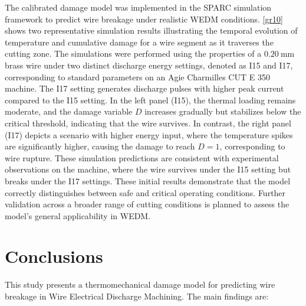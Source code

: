 \documentclass[5p,times,procedia]{elsarticle}
\begin{document}
The calibrated damage model was implemented in the SPARC simulation framework to predict wire breakage under realistic WEDM conditions. \autoref{gr10} shows two representative simulation results illustrating the temporal evolution of temperature and cumulative damage for a wire segment as it traverses the cutting zone. The simulations were performed using the properties of a $0.20~\mathrm{mm}$ brass wire under two distinct discharge energy settings, denoted as I15 and I17, corresponding to standard parameters on an Agie Charmilles CUT E 350 machine. The I17 setting generates discharge pulses with higher peak current compared to the I15 setting. In the left panel (I15), the thermal loading remains moderate, and the damage variable $D$ increases gradually but stabilizes below the critical threshold, indicating that the wire survives. In contrast, the right panel (I17) depicts a scenario with higher energy input, where the temperature spikes are significantly higher, causing the damage to reach $D=1$, corresponding to wire rupture. These simulation predictions are consistent with experimental observations on the machine, where the wire survives under the I15 setting but breaks under the I17 settings. These initial results demonstrate that the model correctly distinguishes between safe and critical operating conditions. Further validation across a broader range of cutting conditions is planned to assess the model's general applicability in WEDM.




\section{Conclusions}
\label{conclusions}

This study presents a thermomechanical damage model for predicting wire breakage in Wire Electrical Discharge Machining. The main findings are:
\end{document}
